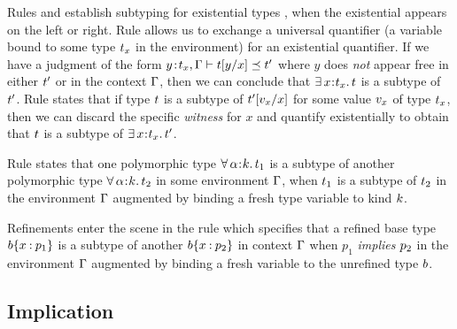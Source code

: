 %
Rules \sBind and \sWitn establish subtyping for existential
types \cite{Knowles09}, \resp when the existential
appears on the left or right.
%
Rule \sBind allows us to exchange a universal quantifier
(a variable bound to some type $\stype_x$ in the environment)
for an existential quantifier.
%
If we have a judgment of the form
$\isSubType{\bind{y}{\stype_x},\tcenv}{\subst{\stype}{x}{y}}{\stype'}$
where $y$ does \emph{not} appear free in either $\stype'$ or in the context $\tcenv$,
then we can conclude that $\existype{x}{\stype_x}{\stype}$
is a subtype of $\stype'$.
%
Rule \sWitn states that if type $\stype$ is a subtype of
$\subst{\stype'}{x}{\sval_x}$ for some value $\sval_x$
of type $\stype_x$, then we can discard the specific
\emph{witness} for $x$ and quantify existentially to
obtain that $\stype$ is a subtype of $\existype{x}{\stype_x}{\stype'}$.
%
\begin{fullversion} 
    Rule \sPoly states that one polymorphic type
    $\polytype{\al}{\skind}{\stype_1}$
    is a subtype of another polymorphic type
    $\polytype{\al}{\skind}{\stype_2}$
    in some environment $\tcenv$, when
    $\stype_1$ is a subtype of $\stype_2$ in the
    environment $\tcenv$ augmented  by binding
    a fresh type variable to kind $\skind$.
\end{fullversion}

Refinements enter the scene in the rule \sBase which
specifies
that a refined base type $\breft{\sbase}{x}{p_1}$
is a subtype of another $\breft{\sbase}{x}{p_2}$
in context $\tcenv$ when $p_1$ \emph{implies} $\spred_2$
in the environment $\tcenv$ augmented by binding
a fresh variable to the unrefined type $\sbase$.
%

\subsection{Implication}
\label{sec:typing:implication}

